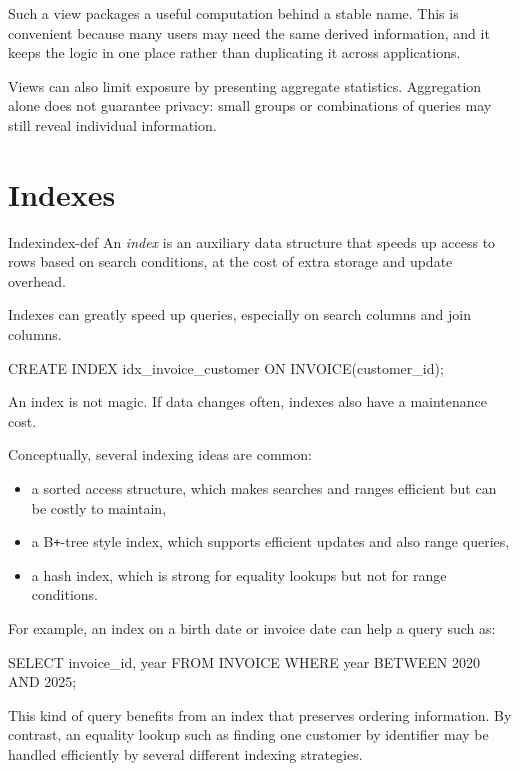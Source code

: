 \documentclass[11pt,a4paper,openany]{book}
\begin{document}
Such a view packages a useful computation behind a stable name. This is convenient because many users may need the same derived information, and it keeps the logic in one place rather than duplicating it across applications.

Views can also limit exposure by presenting aggregate statistics. Aggregation alone does not guarantee privacy: small groups or combinations of queries may still reveal individual information.

\section{Indexes}
\begin{definition}{Index}{index-def}
An \emph{index} is an auxiliary data structure that speeds up access to rows based on search conditions, at the cost of extra storage and update overhead.
\end{definition}

Indexes can greatly speed up queries, especially on search columns and join columns.

\begin{codesql}
CREATE INDEX idx_invoice_customer
ON INVOICE(customer_id);
\end{codesql}

An index is not magic. If data changes often, indexes also have a maintenance cost.

Conceptually, several indexing ideas are common:
\begin{itemize}
\item a sorted access structure, which makes searches and ranges efficient but can be costly to maintain,
\item a B\texttt{+}-tree style index, which supports efficient updates and also range queries,
\item a hash index, which is strong for equality lookups but not for range conditions.
\end{itemize}

For example, an index on a birth date or invoice date can help a query such as:
\begin{codesql}
SELECT invoice_id, year
FROM INVOICE
WHERE year BETWEEN 2020 AND 2025;
\end{codesql}

This kind of query benefits from an index that preserves ordering information. By contrast, an equality lookup such as finding one customer by identifier may be handled efficiently by several different indexing strategies.
\end{document}
